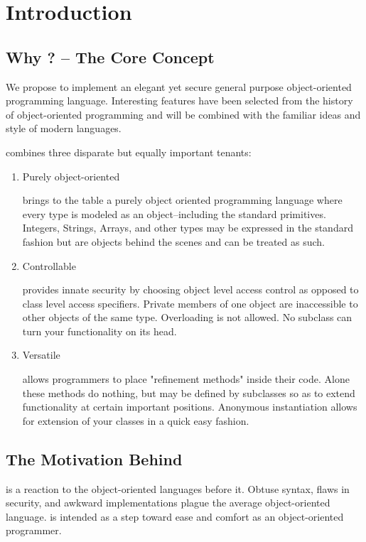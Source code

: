 \section{Introduction}
\subsection{Why \Lang{}? -- The Core Concept}
We propose to implement an elegant yet secure general purpose object-oriented programming language. Interesting features have been selected from the history of object-oriented programming and will be combined with the familiar ideas and style of modern languages.

\Lang{} combines three disparate but equally important tenants:


\begin{enumerate}
\item{Purely object-oriented 
    
    \Lang{} brings to the table a purely object oriented programming language where every type is
    modeled as an object--including the standard primitives. Integers, Strings, Arrays, and other types may be expressed in the standard fashion but are objects behind the scenes and can be treated as such.}

\item{Controllable

   \Lang{} provides innate security by choosing object level access
   control as opposed to class level access specifiers. Private members of one object
   are inaccessible to other objects of the same type. Overloading is not allowed.
   No subclass can turn your functionality on its head.}

\item{Versatile

    \Lang{} allows programmers to place "refinement methods" inside their code.
    Alone these methods do nothing, but may be defined by subclasses so as to extend
    functionality at certain important positions. Anonymous instantiation allows for
    extension of your classes in a quick easy fashion.}
\end{enumerate}

\subsection{ The Motivation Behind \Lang{}}
\Lang{} is a reaction to the object-oriented languages before it.
Obtuse syntax, flaws in security, and awkward implementations plague
the average object-oriented language. \Lang{} is intended as a step
toward ease and comfort as an object-oriented programmer.


